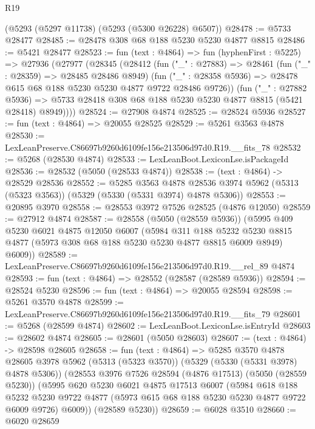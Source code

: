 \begin{lexlean}{R19}
\begin{coremodule}
    (@5293 (@5297 @11738) (@5293 (@5300 @26228) @6507))
@28478 := @5733 @28477
@28485 := @28478 @308 @68 @188 @5230 @5230 @4877 @8815
@28486 := @5421 @28477
@28523 := fun (text : @4864) =>
  fun (hyphenFirst : @5225) =>
  @27936
    (@27977
      (@28345
        (@28412
          (fun ("_" : @27883) =>
          @28461
            (fun ("_" : @28359) => @28485 @28486 @8949)
            (fun ("_" : @28358 @5936) => @28478 @615 @68 @188 @5230 @5230 @4877 @9722 @28486 @9726))
          (fun ("_" : @27882 @5936) =>
          @5733 @28418 @308 @68 @188 @5230 @5230 @4877 @8815 (@5421 @28418) @8949))))
@28524 := @27908 @4874
@28525 := @28524 @5936
@28527 := fun (text : @4864) => @20055 @28525
@28529 := @5261 @3563 @4878
@28530 := LexLeanPreserve.C86697b9260d6109fe156e213506d97d0.R19.__fits_78
@28532 := @5268 (@28530 @4874)
@28533 := LexLeanBoot.LexiconLse.isPackageId
@28536 := @28532 (@5050 (@28533 @4874))
@28538 := (text : @4864) -> @28529 @28536
@28552 := @5285
    @3563
    @4878
    @28536
    @3974
    @5962
    (@5313 (@5323 @3563))
    (@5329 (@5330 (@5331 @3974) @4878 @5306))
@28553 := @20895 @3970
@28558 := @28553 @3972 @7526 @28525 (@4876 @12050)
@28559 := @27912 @4874
@28587 := @28558
    (@5050 (@28559 @5936))
    (@5995
      @409
      @5230
      @6021
      @4875
      @12050
      @6007
      (@5984
        @311
        @188
        @5232
        @5230
        @8815
        @4877
        (@5973 @308 @68 @188 @5230 @5230 @4877 @8815 @6009 @8949)
        @6009))
@28589 := LexLeanPreserve.C86697b9260d6109fe156e213506d97d0.R19.__rel_89 @4874
@28593 := fun (text : @4864) => @28552 (@28587 (@28589 @5936))
@28594 := @28524 @5230
@28596 := fun (text : @4864) => @20055 @28594
@28598 := @5261 @3570 @4878
@28599 := LexLeanPreserve.C86697b9260d6109fe156e213506d97d0.R19.__fits_79
@28601 := @5268 (@28599 @4874)
@28602 := LexLeanBoot.LexiconLse.isEntryId
@28603 := @28602 @4874
@28605 := @28601 (@5050 @28603)
@28607 := (text : @4864) -> @28598 @28605
@28658 := fun (text : @4864) =>
  @5285
    @3570
    @4878
    @28605
    @3978
    @5962
    (@5313 (@5323 @3570))
    (@5329 (@5330 (@5331 @3978) @4878 @5306))
    (@28553
      @3976
      @7526
      @28594
      (@4876 @17513)
      (@5050 (@28559 @5230))
      (@5995
        @620
        @5230
        @6021
        @4875
        @17513
        @6007
        (@5984
          @618
          @188
          @5232
          @5230
          @9722
          @4877
          (@5973 @615 @68 @188 @5230 @5230 @4877 @9722 @6009 @9726)
          @6009))
      (@28589 @5230))
@28659 := @6028 @3510
@28660 := @6020 @28659

\end{coremodule}
\end{lexlean}
